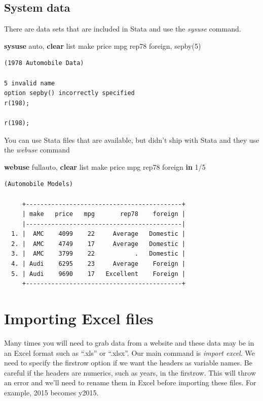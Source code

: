\documentclass[
]{book}
\newenvironment{Shaded}{\begin{snugshade}}{\end{snugshade}}
\newcommand{\KeywordTok}[1]{\textcolor[rgb]{0.13,0.29,0.53}{\textbf{#1}}}
\newcommand{\NormalTok}[1]{#1}
\newcommand{\OtherTok}[1]{\textcolor[rgb]{0.56,0.35,0.01}{#1}}
\begin{document}
\subsection{System data}\label{system-data}

There are data sets that are included in Stata and use the \emph{sysuse} command.

\begin{Shaded}
\begin{Highlighting}[]
\KeywordTok{sysuse}\NormalTok{ auto, }\KeywordTok{clear}
\OtherTok{list}\NormalTok{ make price mpg rep78 foreign, sepby(5)}
\end{Highlighting}
\end{Shaded}

\begin{verbatim}
(1978 Automobile Data)

5 invalid name
option sepby() incorrectly specified
r(198);

r(198);
\end{verbatim}

You can use Stata files that are available, but didn't ship with Stata and
they use the \emph{webuse} command

\begin{Shaded}
\begin{Highlighting}[]
\KeywordTok{webuse}\NormalTok{ fullauto, }\KeywordTok{clear}
\OtherTok{list}\NormalTok{ make price mpg rep78 foreign }\KeywordTok{in}\NormalTok{ 1/5}
\end{Highlighting}
\end{Shaded}

\begin{verbatim}
(Automobile Models)

     +-------------------------------------------+
     | make   price   mpg       rep78    foreign |
     |-------------------------------------------|
  1. |  AMC    4099    22     Average   Domestic |
  2. |  AMC    4749    17     Average   Domestic |
  3. |  AMC    3799    22           .   Domestic |
  4. | Audi    6295    23     Average    Foreign |
  5. | Audi    9690    17   Excellent    Foreign |
     +-------------------------------------------+
\end{verbatim}

\section{Importing Excel files}\label{importing-excel-files}

Many times you will need to grab data from a website and these data may be in an Excel format such as ``.xls'' or ``.xlsx''. Our main command is \emph{import excel}. We need to specify the firstrow option if we want the headers as variable names. Be careful if the headers are numerics, such as years, in the firstrow. This will throw an error and we'll need to rename them in Excel before importing these files. For example, 2015 becomes y2015.
\end{document}
